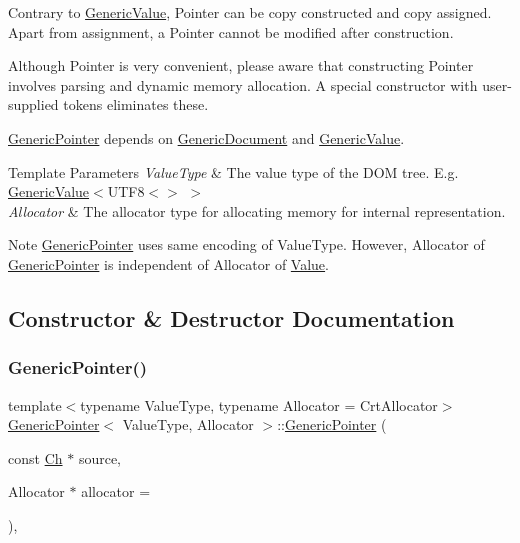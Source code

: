 Contrary to \hyperlink{classGenericValue}{Generic\+Value}, Pointer can be copy constructed and copy assigned. Apart from assignment, a Pointer cannot be modified after construction.

Although Pointer is very convenient, please aware that constructing Pointer involves parsing and dynamic memory allocation. A special constructor with user-\/ supplied tokens eliminates these.

\hyperlink{classGenericPointer}{Generic\+Pointer} depends on \hyperlink{classGenericDocument}{Generic\+Document} and \hyperlink{classGenericValue}{Generic\+Value}.


\begin{DoxyTemplParams}{Template Parameters}
{\em Value\+Type} & The value type of the D\+OM tree. E.\+g. \hyperlink{classGenericValue}{Generic\+Value}$<$U\+T\+F8$<$$>$ $>$ \\
\hline
{\em Allocator} & The allocator type for allocating memory for internal representation.\\
\hline
\end{DoxyTemplParams}
\begin{DoxyNote}{Note}
\hyperlink{classGenericPointer}{Generic\+Pointer} uses same encoding of Value\+Type. However, Allocator of \hyperlink{classGenericPointer}{Generic\+Pointer} is independent of Allocator of \hyperlink{classValue}{Value}. 
\end{DoxyNote}


\subsection{Constructor \& Destructor Documentation}
\mbox{\label{classGenericPointer_a4ad549b8a826c3c2dedf03fcc07be9b0}} 
\subsubsection{\texorpdfstring{Generic\+Pointer()}{GenericPointer()}\hspace{0.1cm}{\footnotesize\ttfamily [1/3]}}
{\footnotesize\ttfamily template$<$typename Value\+Type, typename Allocator = Crt\+Allocator$>$ \\
\hyperlink{classGenericPointer}{Generic\+Pointer}$<$ Value\+Type, Allocator $>$\+::\hyperlink{classGenericPointer}{Generic\+Pointer} (\begin{DoxyParamCaption}\item[{const \hyperlink{classGenericPointer_ab292356c11b4015c98d21b966b11f285}{Ch} $\ast$}]{source,  }\item[{Allocator $\ast$}]{allocator = {} }\end{DoxyParamCaption})\hspace{0.3cm}{\ttfamily [inline]}, {\ttfamily [explicit]}}



